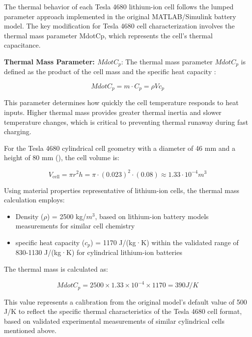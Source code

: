 \documentclass[conference]{IEEEtran}
\begin{document}
The thermal behavior of each Tesla 4680 lithium-ion cell follows the lumped parameter approach implemented in the original MATLAB/Simulink battery model. The key modification for Tesla 4680 cell characterization involves the thermal mass parameter MdotCp, which represents the cell's thermal capacitance.

\textbf{Thermal Mass Parameter: $MdotC_p$}:
The thermal mass parameter $MdotC_p$ is defined as the product of the cell mass and the specific heat capacity \cite{Hu}:

\begin{equation}
MdotC_p = m \cdot C_p = \rho V c_p 
\end{equation}

This parameter determines how quickly the cell temperature responds to heat inputs. Higher thermal mass provides greater thermal inertia and slower temperature changes, which is critical to preventing thermal runaway during fast charging.

For the Tesla 4680 cylindrical cell geometry with a diameter of 46 mm and a height of 80 mm (), the cell volume is:

\begin{equation}
    V_\text{cell} = \pi r^2 h = \pi  \cdot (0.023)^2 \cdot (0.08) \approx 1.33 \cdot 10^{-4}  m^3
\end{equation}

Using material properties representative of lithium-ion cells, the thermal mass calculation employs:
\begin{itemize}
    \item Density ($\rho$) = 2500 kg/$m^3$, based on lithium-ion battery models measurements for similar cell chemistry \cite{kim2020optimization}
    \item specific heat capacity ($c_p$)  = 1170 J/(kg·K)  within the validated range of 830-1130 J/(kg·K) for cylindrical lithium-ion batteries \cite{nigel2022specific}
\end{itemize}

The thermal mass is calculated as:

\begin{equation}
    MdotC_p = 2500 ×1.33×10^{-4}×1170=390 J/K
\end{equation}

This value represents a calibration from the original model's default value of 500 J/K to reflect the specific thermal characteristics of the Tesla 4680 cell format, based on validated experimental measurements of similar cylindrical cells mentioned above. 
\end{document}
